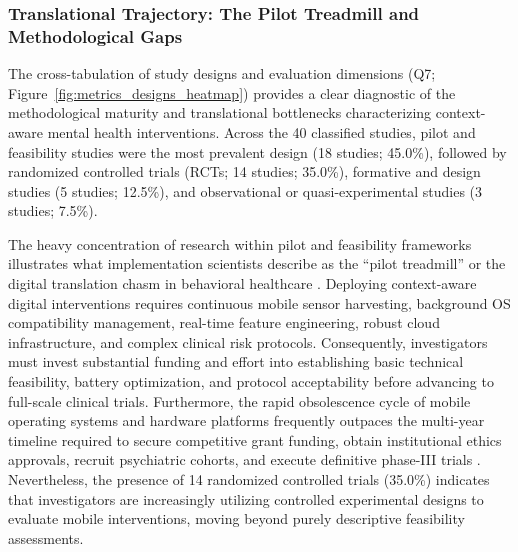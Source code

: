 
\subsubsection{Translational Trajectory: The Pilot Treadmill and Methodological Gaps}

The cross-tabulation of study designs and evaluation dimensions (Q7; Figure~\ref{fig:metrics_designs_heatmap}) provides a clear diagnostic of the methodological maturity and translational bottlenecks characterizing context-aware mental health interventions. Across the 40 classified studies, pilot and feasibility studies were the most prevalent design (18 studies; 45.0\%), followed by randomized controlled trials (RCTs; 14 studies; 35.0\%), formative and design studies (5 studies; 12.5\%), and observational or quasi-experimental studies (3 studies; 7.5\%).

The heavy concentration of research within pilot and feasibility frameworks illustrates what implementation scientists describe as the ``pilot treadmill'' or the digital translation chasm in behavioral healthcare \cite{skivington2021complexinterventions, bosch2025integration}. Deploying context-aware digital interventions requires continuous mobile sensor harvesting, background OS compatibility management, real-time feature engineering, robust cloud infrastructure, and complex clinical risk protocols. Consequently, investigators must invest substantial funding and effort into establishing basic technical feasibility, battery optimization, and protocol acceptability before advancing to full-scale clinical trials. Furthermore, the rapid obsolescence cycle of mobile operating systems and hardware platforms frequently outpaces the multi-year timeline required to secure competitive grant funding, obtain institutional ethics approvals, recruit psychiatric cohorts, and execute definitive phase-III trials \cite{miralles2020smartphone, leaning2024smartphone}. Nevertheless, the presence of 14 randomized controlled trials (35.0\%) indicates that investigators are increasingly utilizing controlled experimental designs to evaluate mobile interventions, moving beyond purely descriptive feasibility assessments.

